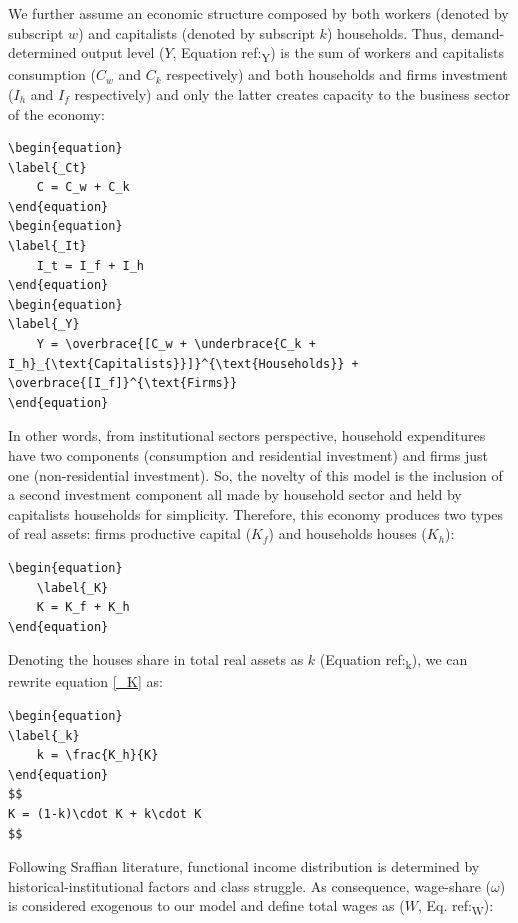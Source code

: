 \documentclass[12pt]{article}
\begin{document}
We further assume an economic structure composed by both workers (denoted by subscript \(w\)) and capitalists (denoted by subscript \(k\)) households.
Thus, demand-determined output level (\(Y\), Equation ref:\textsubscript{Y})  is the sum of workers and capitalists consumption (\(C_w\) and \(C_k\) respectively) and both households and firms investment (\(I_h\) and \(I_f\) respectively) and only the latter creates capacity to the business sector of the economy:
\begin{verbatim}
\begin{equation}
\label{_Ct}
    C = C_w + C_k
\end{equation}
\begin{equation}
\label{_It}
    I_t = I_f + I_h
\end{equation}
\begin{equation}
\label{_Y}
    Y = \overbrace{[C_w + \underbrace{C_k + I_h}_{\text{Capitalists}}]}^{\text{Households}} + \overbrace{[I_f]}^{\text{Firms}}
\end{equation}
\end{verbatim}

In other words, from institutional sectors perspective, household expenditures have two components (consumption and residential investment) and firms just one (non-residential investment).
So, the novelty of this model is the inclusion of a second investment component all made by household sector and held by capitalists households for simplicity. 
Therefore, this economy produces two types of real assets: firms productive capital (\(K_f\)) and households houses (\(K_h\)):
\begin{verbatim}
\begin{equation}
    \label{_K}
    K = K_f + K_h
\end{equation}
\end{verbatim}

Denoting the houses share in total real assets as \(k\) (Equation ref:\textsubscript{k}), we can rewrite equation \ref{_K} as:
\begin{verbatim}
\begin{equation}
\label{_k}
    k = \frac{K_h}{K}
\end{equation}
$$
K = (1-k)\cdot K + k\cdot K
$$
\end{verbatim}

Following Sraffian literature, functional income distribution is determined by historical-institutional factors and class struggle.
As consequence, wage-share (\(\omega\)) is considered exogenous to our model and define total wages as (\(W\), Eq. ref:\textsubscript{W}):
\end{document}
